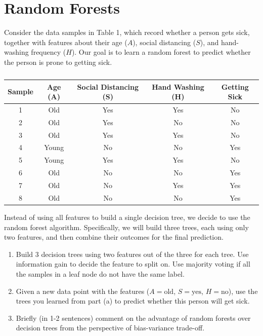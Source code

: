\documentclass[a3paper,12pt]{extarticle} %
\begin{document}
\section{Random Forests}
Consider the data samples in Table 1, which record whether a person gets sick, together with features about their age ($A$), social distancing ($S$), and hand-washing frequency ($H$). Our goal is to learn a random forest to predict whether the person is prone to getting sick.
\begin{table}[h!]
    \centering
    \begin{tabular}{|c|c|c|c|c|}
    \hline
    \textbf{Sample} & \textbf{Age (A)} & \textbf{Social Distancing (S)} & \textbf{Hand Washing (H)} & \textbf{Getting Sick} \\ \hline
    1 & Old & Yes & Yes & No \\ \hline
    2 & Old & Yes & No & No \\ \hline
    3 & Old & Yes & Yes & No \\ \hline
    4 & Young & No & No & Yes \\ \hline
    5 & Young & Yes & Yes & No \\ \hline
    6 & Old & No & No & Yes \\ \hline
    7 & Old & No & Yes & Yes \\ \hline
    8 & Old & No & No & Yes \\ \hline
    \end{tabular}
    \caption{}
    \label{table:data}
    \end{table}

    Instead of using all features to build a single decision tree, we decide to use the random forest algorithm. Specifically, we will build three trees, each using only two features, and then combine their outcomes for the final prediction.

    \begin{enumerate}
        \item  Build 3 decision trees using two features out of the three for each tree. Use information gain to decide the feature to split on. Use majority voting if all the samples in a leaf node do not have the same label.
        \item  Given a new data point with the features ($A = \text{old}$, $S = \text{yes}$, $H = \text{no}$), use the trees you learned from part (a) to predict whether this person will get sick.
        \item  Briefly (in 1-2 sentences) comment on the advantage of random forests over decision trees from the perspective of bias-variance trade-off.
    \end{enumerate}
\end{document}
